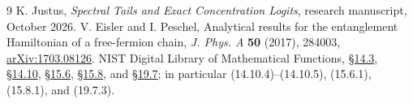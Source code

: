 \documentclass[10pt]{article}
\begin{document}
\begin{thebibliography}{9}
 K. Justus, \emph{Spectral Tails and Exact Concentration Logits},
research manuscript, October 2026.
 V. Eisler and I. Peschel, Analytical results for the
entanglement Hamiltonian of a free-fermion chain,
\emph{J. Phys. A} \textbf{50} (2017), 284003,
\href{https://arxiv.org/abs/1703.08126}{arXiv:1703.08126}.
 NIST Digital Library of Mathematical Functions,
\href{https://dlmf.nist.gov/14.3}{\S14.3},
\href{https://dlmf.nist.gov/14.10}{\S14.10},
\href{https://dlmf.nist.gov/15.6}{\S15.6},
\href{https://dlmf.nist.gov/15.8}{\S15.8}, and
\href{https://dlmf.nist.gov/19.7}{\S19.7}; in particular
(14.10.4)--(14.10.5), (15.6.1), (15.8.1), and (19.7.3).
\end{thebibliography}
\end{document}
